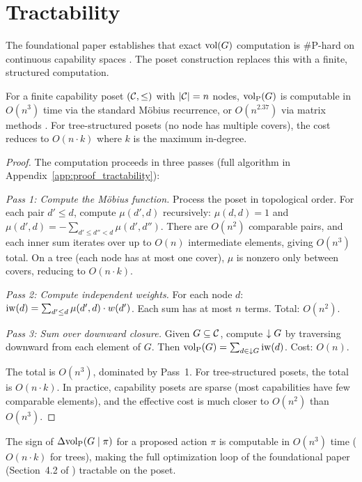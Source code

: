 \section{Tractability}
\label{sec:tractability}

The foundational paper establishes that exact $\operatorname{vol}(G)$ computation is
\#P-hard on continuous capability spaces \citep{dyer1988complexity}. The
poset construction replaces this with a finite, structured computation.

\begin{proposition}
\label{prop:tractability}
For a finite capability poset $(\mathcal{C}, \leq)$ with $|\mathcal{C}| = n$ nodes,
    ${\operatorname{vol}_{\mathrm{P}}}(G)$ is computable in $O(n^3)$ time via the standard M\"{o}bius
    recurrence, or $O(n^{2.37})$ via matrix methods
    \citep{stanley1997enumerative}. For tree-structured posets (no node has
    multiple covers), the cost reduces to $O(n \cdot k)$ where $k$ is the
    maximum in-degree.
\end{proposition}

\begin{proof}
The computation proceeds in three passes (full algorithm in
Appendix~\ref{app:proof_tractability}):

\emph{Pass 1: Compute the M\"{o}bius function.} Process the poset in
topological order. For each pair $d' \leq d$, compute $\mu(d', d)$ recursively:
$\mu(d, d) = 1$ and $\mu(d', d) = -\sum_{d' \leq d'' < d} \mu(d', d'')$. There
are $O(n^2)$ comparable pairs, and each inner sum iterates over up to $O(n)$
intermediate elements, giving $O(n^3)$ total. On a tree (each node has at most
one cover), $\mu$ is nonzero only between covers, reducing to $O(n \cdot k)$.

\emph{Pass 2: Compute independent weights.} For each node $d$:
$\operatorname{iw}(d) = \sum_{d' \leq d} \mu(d', d) \cdot w(d')$. Each sum has at most $n$
terms. Total: $O(n^2)$.

\emph{Pass 3: Sum over downward closure.} Given $G \subseteq \mathcal{C}$, compute
$\downarrow G$ by traversing downward from each element of $G$. Then ${\operatorname{vol}_{\mathrm{P}}}(G) =
\sum_{d \in \downarrow G} \operatorname{iw}(d)$. Cost: $O(n)$.

The total is $O(n^3)$, dominated by Pass~1. For tree-structured posets,
the total is $O(n \cdot k)$. In practice, capability posets are sparse
(most capabilities have few comparable elements), and the effective cost is
much closer to $O(n^2)$ than $O(n^3)$.
\end{proof}

\begin{corollary}
\label{cor:sign_tractable}
The sign of $\Delta {\operatorname{vol}_{\mathrm{P}}}(G \mid \pi)$ for a proposed action $\pi$ is
    computable in $O(n^3)$ time ($O(n \cdot k)$ for trees), making the full
    optimization loop of the foundational paper (Section~4.2 of
    \citet{lasser2026gfm}) tractable on the poset.
\end{corollary}

